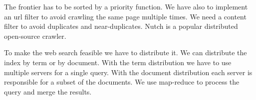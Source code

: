 The frontier has to be sorted by a priority function.
We have also to implement an url filter to avoid crawling
the same page multiple times.
We need a content filter to avoid duplicates and near-duplicates.
Nutch is a popular distributed open-source crawler.

To make the web search feasible we have to distribute it.
We can distribute the index by term or by document.
With the term distribution we have to use multiple servers
for a single query.
With the document distribution each server is responsible
for a subset of the documents.
We use map-reduce to process the query and merge the results.
